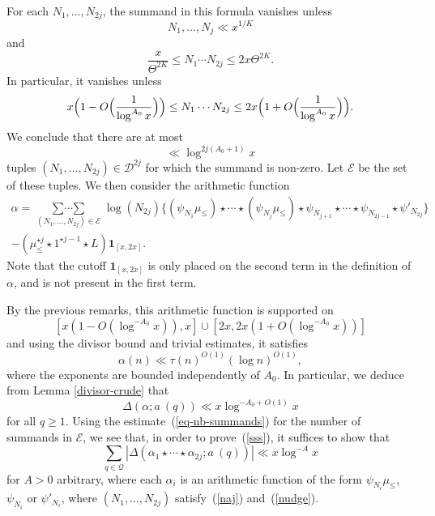 \documentclass[12pt,a4paper,reqno]{amsart}
\numberwithin{equation}{section}
\theoremstyle{plain}
\theoremstyle{definition}
\newcommand\multsum{\mathop{\sum\cdots\sum}\limits}
\newcommand{\onef}{\mathbf{1}}
\begin{document}
For each $N_1, \ldots, N_{2j}$, the summand in this formula vanishes
unless
\begin{equation}\label{naj}
  N_1,\ldots,N_j \ll x^{1/K}
\end{equation}
and
$$
\frac{x}{\Theta^{2K}}
\leq N_1 \cdots N_{2j} \leq 2x\Theta^{2K}.
$$
In particular, it vanishes unless
\begin{equation}\label{nudge}
  x\Bigl(1-O\Bigl(\frac{1}{\log^{A_0}x}\Bigr)\Bigr)
  \leq N_1 \cdots N_{2j} \leq 
  2x\Bigl(1+O\Bigl(\frac{1}{\log^{A_0}x }\Bigr)\Bigr).
\end{equation}
We conclude that there are at most 
\begin{equation}\label{eq-nb-summands}
  \ll \log^{2j(A_0+1)}x
\end{equation}
tuples $(N_1,\ldots, N_{2j})\in\mathcal{D}^{2j}$ for which the summand is
non-zero. Let $\mathcal{E}$ be the set of these tuples. We then
consider the arithmetic function
\begin{multline}
  \alpha= \multsum_{(N_1,\ldots, N_{2j})\in\mathcal{E}} \log(N_{2j})
  \{(\psi_{N_1} \mu_{\leq} ) \star \cdots \star ( \psi_{N_j} \mu_{\leq})
  \star \psi_{N_{j+1}} \star \cdots \star \psi_{N_{2j-1}}
  \star \psi'_{N_{2j}}\}\\
  - (\mu_{\leq}^{\star j} \star 1^{\star j-1} \star L) \onef_{[x,2x]}.
\end{multline}
Note that the cutoff $\onef_{[x,2x]}$ is only placed on the second term in the definition of $\alpha$, and is not present in the first term.
\par
By the previous remarks, this arithmetic function is supported on
$$
[x(1-O(\log^{-A_0}x)),x]\cup [2x,2x(1+O(\log^{-A_0} x))]
$$
and using the divisor bound and trivial estimates, it satisfies
$$
\alpha(n)\ll \tau(n)^{O(1)}(\log n)^{O(1)},
$$
where the exponents are bounded independently of $A_0$. In particular,
we deduce from Lemma \ref{divisor-crude} that
$$
\Delta(\alpha; a\ (q))\ll x\log^{-A_0+O(1)} x
$$
for all $q\geq 1$. Using the estimate~(\ref{eq-nb-summands}) for the
number of summands in $\mathcal{E}$, we see that, in order to
prove~(\ref{sss}), it suffices to show that
\begin{equation}\label{tap}
\sum_{q\in\mathcal{Q}}|\Delta(\alpha_1\star\cdots\star \alpha_{2j}; a\
(q))|\ll x\log^{-A}x
\end{equation}
for $A>0$ arbitrary, where each $\alpha_i$ is an arithmetic function
of the form $\psi_{N_i} \mu_{\leq }$, $\psi_{N_i}$ or $\psi'_{N_i}$,
where $(N_1,\ldots, N_{2j})$ satisfy~(\ref{naj}) and~(\ref{nudge}).
\end{document}
